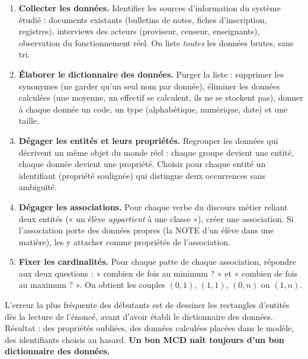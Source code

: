 \documentclass[11pt]{article}
\newcommand{\cle}[1]{{\popxbold\color{popdark}#1}}
\newcounter{popsec}
\newcounter{popsub}
\newcommand{\courssub}[1]{%
  \stepcounter{popsub}%
  \par\vspace{9pt}\noindent{\popxbold\fontsize{11.5}{13}\selectfont\color{popink}{\color{poporange}\thepopsec.\thepopsub}\hspace{6pt}#1}\par\nopagebreak\vspace{4pt}
}
\begin{document}
\begin{methode}
\begin{enumerate}
\item \textbf{Collecter les données.} Identifier les sources d'information du système étudié : documents existants (bulletins de notes, fiches d'inscription, registres), interviews des acteurs (proviseur, censeur, enseignants), observation du fonctionnement réel. On liste \emph{toutes} les données brutes, sans tri.
\item \textbf{Élaborer le dictionnaire des données.} Purger la liste : supprimer les synonymes (ne garder qu'un seul nom par donnée), éliminer les données calculées (une moyenne, un effectif se calculent, ils ne se stockent pas), donner à chaque donnée un code, un type (alphabétique, numérique, date) et une taille.
\item \textbf{Dégager les entités et leurs propriétés.} Regrouper les données qui décrivent un même objet du monde réel : chaque groupe devient une \cle{entité}, chaque donnée devient une \cle{propriété}. Choisir pour chaque entité un \cle{identifiant} (propriété soulignée) qui distingue deux occurrences sans ambiguïté.
\item \textbf{Dégager les associations.} Pour chaque verbe du discours métier reliant deux entités (« un élève \emph{appartient} à une classe »), créer une \cle{association}. Si l'association porte des données propres (la NOTE d'un élève dans une matière), les y attacher comme propriétés de l'association.
\item \textbf{Fixer les cardinalités.} Pour chaque patte de chaque association, répondre aux deux questions : « combien de fois au minimum ? » et « combien de fois au maximum ? ». On obtient les couples $(0,1)$, $(1,1)$, $(0,n)$ ou $(1,n)$.
\end{enumerate}
\end{methode}

\begin{attention}
L'erreur la plus fréquente des débutants est de dessiner les rectangles d'entités dès la lecture de l'énoncé, avant d'avoir établi le dictionnaire des données. Résultat : des propriétés oubliées, des données calculées placées dans le modèle, des identifiants choisis au hasard. \textbf{Un bon MCD naît toujours d'un bon dictionnaire des données.}
\end{attention}

\courssub{Étude de cas complète : le MCD du lycée}
\end{document}
